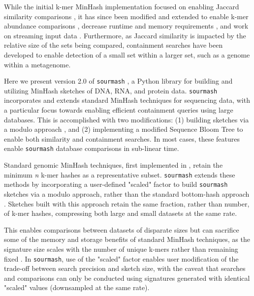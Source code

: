 \documentclass[10pt,a4paper,twocolumn]{article}
\begin{document}
While the initial k-mer MinHash implementation focused on enabling Jaccard similarity comparisons \cite{ondov2016mash}, it has since been modified and extended to enable k-mer abundance comparisons \cite{boveefinch}, decrease runtime and memory requirements \cite{zhao2018bindash}, and work on streaming input data \cite{rowe2019streaming}. Furthermore, as Jaccard similarity is impacted by the relative size of the sets being compared, containment searches \cite{broder1997resemblance, koslicki2019improving, mash_screen} have been developed to enable detection of a small set within a larger set, such as a genome within a metagenome.

Here we present version 2.0 of \lstinline{sourmash} \cite{brown2016sourmash}, a Python library for building and utilizing MinHash sketches of DNA, RNA, and protein data. \lstinline{sourmash} incorporates and extends standard MinHash techniques for sequencing data, with a particular focus towards enabling efficient containment queries using large databases. This is accomplished with two modifications: (1) building sketches via a modulo approach \cite{broder1997resemblance}, and (2) implementing a modified Sequence Bloom Tree \cite{solomon2016fast} to enable both similarity and containment searches. In most cases, these features enable \lstinline{sourmash} database comparisons in sub-linear time.

Standard genomic MinHash techniques, first implemented in \cite{ondov2016mash}, retain the minimum \textit{n} k-mer hashes as a representative subset. \lstinline{sourmash} extends these methods by incorporating a user-defined "scaled" factor to build \lstinline{sourmash} sketches via a modulo approach, rather than the standard bottom-hash approach \cite{broder1997resemblance}. Sketches built with this approach retain the same fraction, rather than number, of k-mer hashes, compressing both large and small datasets at the same rate. 

This enables comparisons between datasets of disparate sizes but can sacrifice some of the memory and storage benefits of standard MinHash techniques, as the signature size scales with the number of unique k-mers rather than remaining fixed \cite{mash_screen}. In \lstinline{sourmash}, use of the "scaled" factor enables user modification of the trade-off between search precision and sketch size, with the caveat that searches and comparisons can only be conducted using signatures generated with identical "scaled" values (downsampled at the same rate). 
\end{document}
